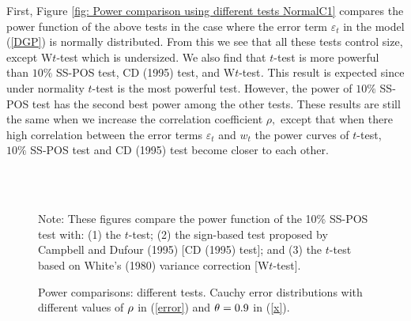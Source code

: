 \documentclass[harvard,11pt]{article}
\begin{document}
First, Figure \ref{fig: Power comparison using different tests NormalC1}
compares the power function of the above tests in the case where the error
term $\varepsilon _{t}$ in the model (\ref{DGP}) is normally distributed.
From this we see that all these tests control size, except W$t$-test which is
undersized. We also find that $t$-test is more powerful than $10\%$ SS-POS
test, CD (1995) test, and W$t$-test\textit{.} This result is expected since under
normality $t$-test is the most powerful test. However, the power of $10\%$
SS-POS test has the second best power among the other tests. These results
are still the same when we increase the correlation coefficient $\rho ,$
except that when there high correlation between the error terms $\varepsilon
_{t}$ and $w_{t}$ the power curves of $t$-test, $10\%$ SS-POS test and CD (1995)
test become closer to each other. 
\begin{figure}[tbph]
\caption{Power comparisons: different tests. Cauchy error distributions with
different values of $\protect\rho $ in (\protect\ref{error}) and $\protect%
\theta =0.9$ in (\protect\ref{x}).}
\begin{center}
 \\[0pt]
\\[0pt]
\end{center}

Note: These figures compare the power
function of the 10\% SS-POS test with: (1) the $t$-test; (2) the sign-based test
proposed by Campbell and Dufour (1995) [CD (1995) test]; and (3) the $t$-test based
on White's (1980) variance correction [W$t$-test]. 
\label{fig: Power comparaison using different tests CauchyC1}
\end{figure}
\end{document}
